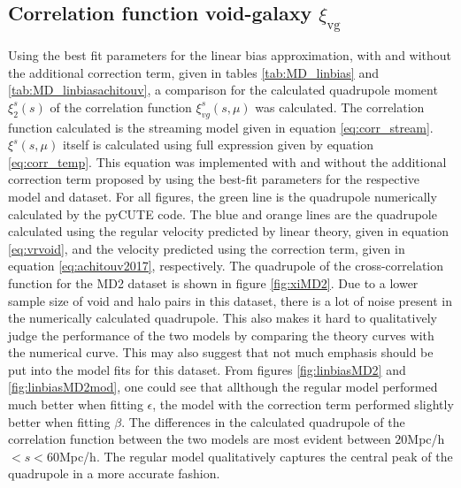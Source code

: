 \subsection{Correlation function void-galaxy $\xi_{\mathrm{vg}}$}
Using the best fit parameters for the linear bias approximation, with and without the additional correction term, given in tables \ref{tab:MD_linbias} and \ref{tab:MD_linbiasachitouv}, a comparison for the calculated quadrupole moment $\xi_2^s(s)$ of the correlation function $\xi_{vg}^s(s,\mu)$ was calculated. The correlation function calculated is the streaming model given in equation \ref{eq:corr_stream}. $\xi^s(s,\mu)$ itself is calculated using full expression given by equation \ref{eq:corr_temp}. This equation was implemented with and without the additional correction term proposed by \cite{Achitouv_streaming} using the best-fit parameters for the respective model and dataset. For all figures, the green line is the quadrupole numerically calculated by the pyCUTE code. The blue and orange lines are the quadrupole calculated using the regular velocity predicted by linear theory, given in equation \ref{eq:vrvoid}, and the velocity predicted using the correction term, given in equation \ref{eq:achitouv2017}, respectively. The quadrupole of the cross-correlation function for the MD2 dataset is shown in figure \ref{fig:xiMD2}. Due to a lower sample size of void and halo pairs in this dataset, there is a lot of noise present in the numerically calculated quadrupole. This also makes it hard to qualitatively judge the performance of the two models by comparing the theory curves with the numerical curve. This may also suggest that not much emphasis should be put into the model fits for this dataset. From figures \ref{fig:linbiasMD2} and \ref{fig:linbiasMD2mod}, one could see that allthough the regular model performed much better when fitting $\epsilon$, the model with the correction term performed slightly better when fitting $\beta$. The differences in the calculated quadrupole of the correlation function between the two models are most evident between $20$Mpc/h$<s<60$Mpc/h. The regular model qualitatively captures the central peak of the quadrupole in a more accurate fashion.\\\indent
